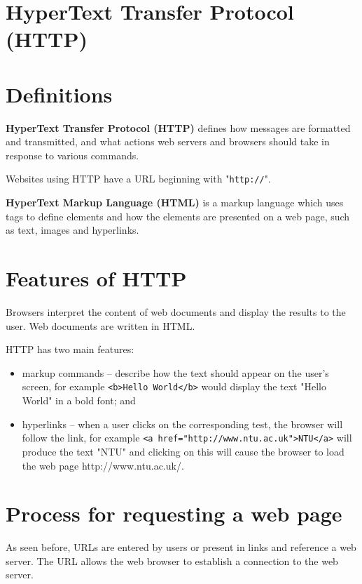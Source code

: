\documentclass[a4paper]{systems-software}
\begin{document}
\newpage

\section{HyperText Transfer Protocol (HTTP)}

\section*{Definitions}

\textbf{HyperText Transfer Protocol (HTTP)} defines how messages are formatted and transmitted, and what actions web servers and browsers should take in response to various commands.

Websites using HTTP have a URL beginning with "\texttt{http://}".

\textbf{HyperText Markup Language (HTML)} is a markup language which uses tags to define elements and how the elements are presented on a web page, such as text, images and hyperlinks.


\section*{Features of HTTP}

Browsers interpret the content of web documents and display the results to the user. Web documents are written in HTML.

HTTP has two main features:
\begin{itemize}
	\item markup commands -- describe how the text should appear on the user's screen, for example \texttt{<b>Hello World</b>} would display the text "Hello World" in a bold font; and
	\item hyperlinks -- when a user clicks on the corresponding test, the browser will follow the link, for example \texttt{<a href="http://www.ntu.ac.uk">NTU</a>} will produce the text "NTU" and clicking on this will cause the browser to load the web page http://www.ntu.ac.uk/.
\end{itemize}


\section*{Process for requesting a web page}

As seen before, URLs are entered by users or present in links and reference a web server. The URL allows the web browser to establish a connection to the web server.
\end{document}
